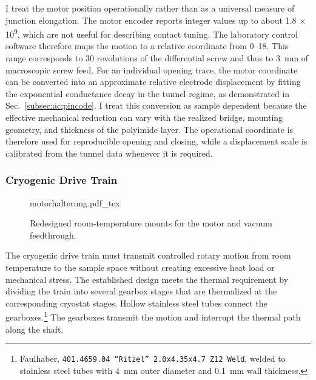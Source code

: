         I treat the motor position operationally rather than as a universal measure of junction elongation. The motor encoder reports integer values up to about 1.8$\,\times\,$10\textsuperscript{9}, which are not useful for describing contact tuning. The laboratory control software therefore maps the motion to a relative coordinate from \qtyrange{0}{18}{}. This range corresponds to 30 revolutions of the differential screw and thus to \qty{3}{\milli\meter} of macroscopic screw feed. For an individual opening trace, the motor coordinate can be converted into an approximate relative electrode displacement by fitting the exponential conductance decay in the tunnel regime, as demonstrated in Sec.~\ref{subsec:ac:pincode}. I treat this conversion as sample dependent because the effective mechanical reduction can vary with the realized bridge, mounting geometry, and thickness of the polyimide layer. The operational coordinate is therefore used for reproducible opening and closing, while a displacement scale is calibrated from the tunnel data whenever it is required.

        \subsubsection*{Cryogenic Drive Train}

            \begin{figure}
                \captionsetup{format=plain}%
                \centering
                \vspace{-1.3em}
                {motorhalterung.pdf_tex}
                \caption{Redesigned room-temperature mounts for the motor and vacuum feedthrough.}
                \label{fig:setup:motorhalterung}
            \end{figure}

            The cryogenic drive train must transmit controlled rotary motion from room temperature to the sample space without creating excessive heat load or mechanical stress. The established design meets the thermal requirement by dividing the train into several gearbox stages that are thermalized at the corresponding cryostat stages. Hollow stainless steel tubes connect the gearboxes.\footnote{Faulhaber, \texttt{401.4659.04 ``Ritzel'' 2.0x4.35x4.7 Z12 Weld}, welded to stainless steel tubes with \qty{4}{\milli\meter} outer diameter and \qty{0.1}{\milli\meter} wall thickness.} The gearboxes transmit the motion and interrupt the thermal path along the shaft.

